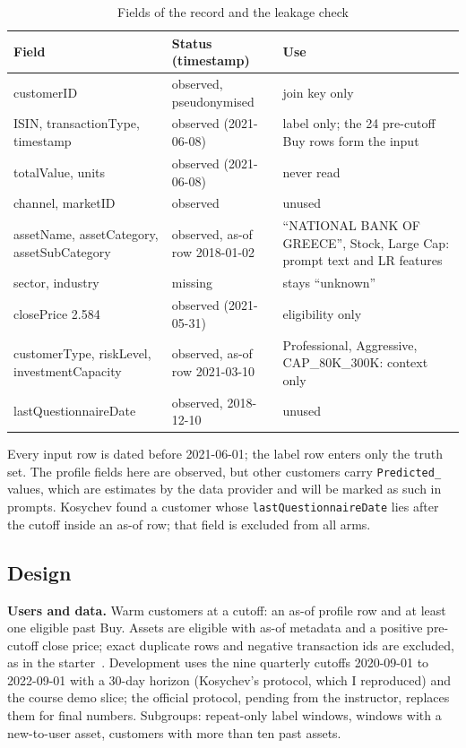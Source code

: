 \documentclass[conference]{IEEEtran}
\begin{document}
\begin{table}[t]
\caption{Fields of the record and the leakage check}
\label{tab:fields}
\centering
\footnotesize
\begin{tabular}{@{}>{\raggedright\arraybackslash}p{2.5cm}>{\raggedright\arraybackslash}p{2.2cm}>{\raggedright\arraybackslash}p{3.3cm}@{}}
\toprule
Field & Status (timestamp) & Use\\
\midrule
customerID & observed, pseudonymised & join key only\\
ISIN, transactionType, timestamp & observed (2021-06-08) & label only; the 24 pre-cutoff Buy rows form the input\\
totalValue, units & observed (2021-06-08) & never read\\
channel, marketID & observed & unused\\
assetName, assetCategory, assetSubCategory & observed, as-of row 2018-01-02 & ``NATIONAL BANK OF GREECE'', Stock, Large Cap: prompt text and LR features\\
sector, industry & missing & stays ``unknown''\\
closePrice 2.584 & observed (2021-05-31) & eligibility only\\
customerType, riskLevel, investmentCapacity & observed, as-of row 2021-03-10 & Professional, Aggressive, CAP\_80K\_300K: context only\\
lastQuestionnaireDate & observed, 2018-12-10 & unused\\
\bottomrule
\end{tabular}
\end{table}

Every input row is dated before 2021-06-01; the label row enters only the truth set. The profile fields here are observed, but other customers carry \texttt{Predicted\_} values, which are estimates by the data provider and will be marked as such in prompts. Kosychev found a customer whose \texttt{lastQuestionnaireDate} lies after the cutoff inside an as-of row; that field is excluded from all arms.

\subsection{Design}
\textbf{Users and data.} Warm customers at a cutoff: an as-of profile row and at least one eligible past Buy. Assets are eligible with as-of metadata and a positive pre-cutoff close price; exact duplicate rows and negative transaction ids are excluded, as in the starter~\cite{starter}. Development uses the nine quarterly cutoffs 2020-09-01 to 2022-09-01 with a 30-day horizon (Kosychev's protocol, which I reproduced) and the course demo slice; the official protocol, pending from the instructor, replaces them for final numbers. Subgroups: repeat-only label windows, windows with a new-to-user asset, customers with more than ten past assets.
\end{document}
